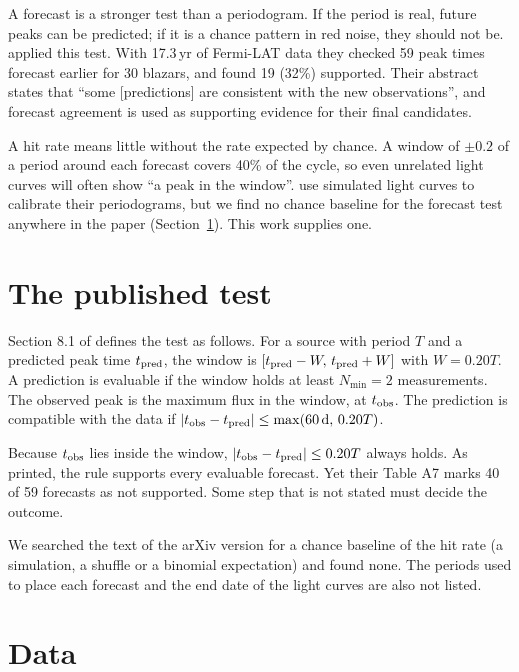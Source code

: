\documentclass[twocolumn]{aastex631}
\begin{document}
A forecast is a stronger test than a periodogram. If the period is real, future peaks can be predicted; if it is a chance pattern in red noise, they should not be. \citet{penil26} applied this test. With 17.3\,yr of Fermi-LAT data they checked 59 peak times forecast earlier \citep{rico25, penil25c} for 30 blazars, and found 19 (32\%) supported. Their abstract states that ``some [predictions] are consistent with the new observations'', and forecast agreement is used as supporting evidence for their final candidates.

A hit rate means little without the rate expected by chance. A window of $\pm0.2$ of a period around each forecast covers 40\% of the cycle, so even unrelated light curves will often show ``a peak in the window''. \citet{penil26} use simulated light curves to calibrate their periodograms, but we find no chance baseline for the forecast test anywhere in the paper (Section~\ref{sec:published}). This work supplies one.

\section{The published test} \label{sec:published}

Section 8.1 of \citet{penil26} defines the test as follows. For a source with period $T$ and a predicted peak time $t_{\rm pred}$, the window is $[t_{\rm pred}-W,\,t_{\rm pred}+W]$ with $W = 0.20T$. A prediction is evaluable if the window holds at least $N_{\min}=2$ measurements. The observed peak is the maximum flux in the window, at $t_{\rm obs}$. The prediction is compatible with the data if $|t_{\rm obs}-t_{\rm pred}| \le \max(60\,{\rm d},\,0.20T)$.

Because $t_{\rm obs}$ lies inside the window, $|t_{\rm obs}-t_{\rm pred}| \le 0.20T$ always holds. As printed, the rule supports every evaluable forecast. Yet their Table A7 marks 40 of 59 forecasts as not supported. Some step that is not stated must decide the outcome.

We searched the text of the arXiv version for a chance baseline of the hit rate (a simulation, a shuffle or a binomial expectation) and found none. The periods used to place each forecast and the end date of the light curves are also not listed.

\section{Data} \label{sec:data}
\end{document}
